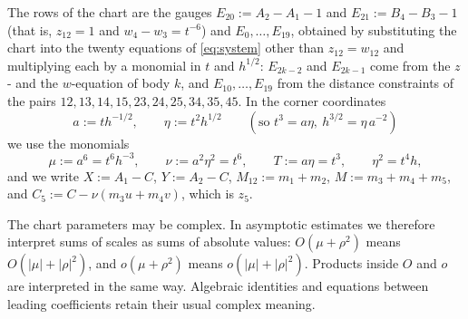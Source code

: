 \documentclass[Threeside,11pt]{article}
\theoremstyle{definition}
\theoremstyle{remark}
\numberwithin{equation}{section}
\theoremstyle{remark}
\begin{document}
The rows of the chart are the gauges $E_{20}:=A_2-A_1-1$ and $E_{21}:=B_4-B_3-1$ (that is,
$z_{12}=1$ and $w_4-w_3=t^{-6}$) and $E_0,\dots,E_{19}$, obtained by substituting the chart into
the twenty equations of \eqref{eq:system} other than $z_{12}=w_{12}$ and multiplying each by a
monomial in $t$ and $h^{1/2}$: $E_{2k-2}$ and $E_{2k-1}$ come from the $z$- and the $w$-equation
of body $k$, and $E_{10},\dots,E_{19}$ from the distance constraints of the pairs
$12,13,14,15,23,24,25,34,35,45$.
In the corner coordinates
\[
  a:=th^{-1/2},\qquad \eta:=t^2h^{1/2}\qquad(\text{so } t^3=a\eta,\ h^{3/2}=\eta\,a^{-2})
\]
we use the monomials
\[
  \mu:=a^6=t^6h^{-3},\qquad \nu:=a^2\eta^2=t^6,\qquad T:=a\eta=t^3,\qquad \eta^2=t^4h,
\]
and we write $X:=A_1-C$, $Y:=A_2-C$, $M_{12}:=m_1+m_2$, $M:=m_3+m_4+m_5$, and
$C_5:=C-\nu(m_3u+m_4v)$, which is $z_5$.

{The chart parameters may be complex.  In asymptotic estimates we therefore
interpret sums of scales as sums of absolute values: $O(\mu+\rho^2)$ means
$O(|\mu|+|\rho|^2)$, and $o(\mu+\rho^2)$ means $o(|\mu|+|\rho|^2)$.
Products inside $O$ and $o$ are interpreted in the same way.  Algebraic identities and
equations between leading coefficients retain their usual complex meaning.}
\end{document}
